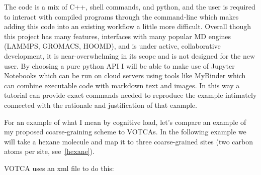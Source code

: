 The code is a mix of C++, shell commands, and python, and the user is required to interact with compiled programs through the command-line which makes adding this code into an existing workflow a little more difficult.
Overall though this project has many features, interfaces with many popular MD engines (LAMMPS, GROMACS, HOOMD), and is under active, collaborative development, it is near-overwhelming in its scope and is not designed for the new user.
By choosing a pure python API I will be able to make use of Jupyter Notebooks which can be run on cloud servers using tools like MyBinder which can combine executable code with markdown text and images\cite{mybinder, jupyter, notebooktutorials}.
In this way a tutorial can provide exact commands needed to reproduce the example intimately connected with the rationale and justification of that example.

For an example of what I mean by cognitive load, let's compare an example of my proposed coarse-graining scheme to VOTCAs.
In the following example we will take a hexane molecule and map it to three coarse-grained sites (two carbon atoms per site, see~\autoref{hexane}).

VOTCA uses an xml file to do this:




